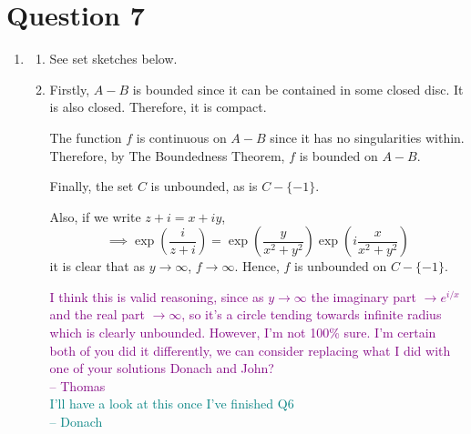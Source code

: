 \section{Question 7}
\begin{enumerate}[label=(\alph*)]
\item
    \begin{enumerate}[label=(\roman*)]
    \item See set sketches below.
    \item 
    Firstly, $A-B$ is bounded since it can be contained in some closed disc. It is also closed. Therefore, it is compact.
    
    The function $f$ is continuous on $A-B$ since it has no singularities within. Therefore, by The Boundedness Theorem, $f$ is bounded on $A-B$.

    Finally, the set $C$ is unbounded, as is $C - \{-1\}$.

    Also, if we write $z+i = x+iy$,
    \[
    \implies \exp\left(\frac{i}{z+i}\right) = \exp\left(\frac{y}{x^2+y^2}\right)\exp\left(i\frac{x}{x^2+y^2}\right)
    \]
    it is clear that as $y\rightarrow\infty$, $f\rightarrow\infty$. Hence, $f$ is unbounded on $C-\{-1\}$.

    \textcolor{purple}{I think this is valid reasoning, since as $y\rightarrow\infty$ the imaginary part $\rightarrow e^{i/x}$ and the real part $\rightarrow \infty$, so it's a circle tending towards infinite radius which is clearly unbounded. However, I'm not 100\% sure. I'm certain both of you did it differently, we can consider replacing what I did with one of your solutions Donach and John?\\ -- Thomas} \\
    \textcolor{teal}{I'll have a look at this once I've finished Q6 \\ -- Donach}
    
    \end{enumerate}


\end{enumerate}
